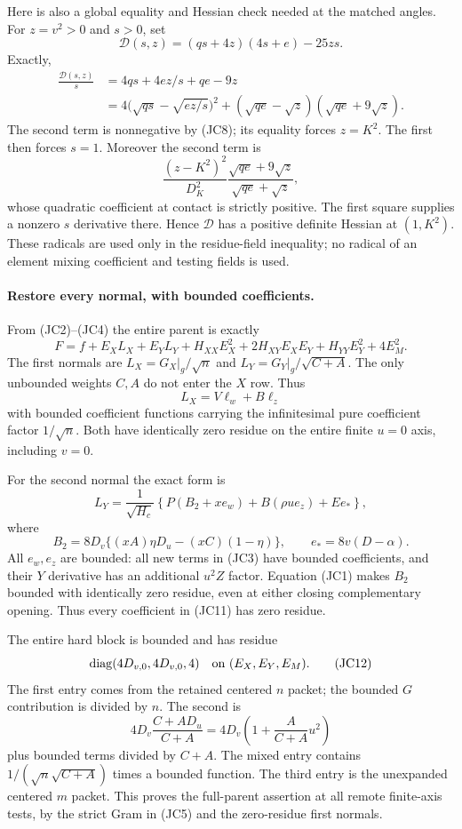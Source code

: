 Here is also a global equality and Hessian check needed at the
matched angles.  For $z=v^2>0$ and $s>0$, set
\[
 \mathcal D(s,z)=(q s+4z)(4s+e)-25zs.
\]
Exactly,
\begin{align*}
 \frac{\mathcal D(s,z)}s
 &=4qs+4ez/s+qe-9z\\
 &=4\bigl(\sqrt{qs}-\sqrt{ez/s}\bigr)^2
       +(\sqrt{qe}-\sqrt z)(\sqrt{qe}+9\sqrt z).    \tag{JC9}
\end{align*}
The second term is nonnegative by (JC8); its equality forces
$z=K^2$.  The first then forces $s=1$.  Moreover the second term is
\[
 \frac{(z-K^2)^2}{D_K^2}
       \frac{\sqrt{qe}+9\sqrt z}{\sqrt{qe}+\sqrt z},
\]
whose quadratic coefficient at contact is strictly positive.
The first square supplies a nonzero $s$ derivative there.
Hence $\mathcal D$ has a positive definite Hessian at $(1,K^2)$.
These radicals are used only in the residue-field inequality; no
radical of an element mixing coefficient and testing fields is used.

\paragraph{Restore every normal, with bounded coefficients.}
From (JC2)--(JC4) the entire parent is exactly
\[
 F=f+E_XL_X+E_YL_Y+
 H_{XX}E_X^2+2H_{XY}E_XE_Y+H_{YY}E_Y^2+4E_M^2.        \tag{JC10}
\]
The first normals are $L_X=G_X|_g/\sqrt n$ and
$L_Y=G_Y|_g/\sqrt{C+A}$.  The only unbounded weights $C,A$ do not
enter the $X$ row.  Thus
\[
 L_X=V\ell_w+B\ell_z
\]
with bounded coefficient functions carrying the infinitesimal
pure coefficient factor $1/\sqrt n$.  Both have identically zero
residue on the entire finite $u=0$ axis, including $v=0$.

For the second normal the exact form is
\[
 L_Y=\frac1{\sqrt{H_c}}\left\{
 P(B_2+xe_w)+B(\rho u e_z)+E e_*\right\},            \tag{JC11}
\]
where
\[
 B_2=8D_v\{(xA)\eta D_u-(xC)(1-\eta)\},\qquad
 e_*=8v(D-\alpha).
\]
All $e_w,e_z$ are bounded: all new terms in (JC3) have bounded
coefficients, and their $Y$ derivative has an additional $u^2Z$
factor.  Equation (JC1) makes $B_2$ bounded with identically zero
residue, even at either closing complementary opening.  Thus every
coefficient in (JC11) has zero residue.

The entire hard block is bounded and has residue
\[
             \operatorname{diag}(4D_{v,0},4D_{v,0},4)
                   \quad\hbox{on }(E_X,E_Y,E_M).      \tag{JC12}
\]
The first entry comes from the retained centered $n$ packet;
the bounded $G$ contribution is divided by $n$.  The second is
\[
 4D_v\frac{C+AD_u}{C+A}
   =4D_v\left(1+\frac A{C+A}u^2\right)
\]
plus bounded terms divided by $C+A$.  The mixed entry contains
$1/(\sqrt n\sqrt{C+A})$ times a bounded function.  The third
entry is the unexpanded centered $m$ packet.  This proves the
full-parent assertion at all remote finite-axis tests, by the
strict Gram in (JC5) and the zero-residue first normals.

